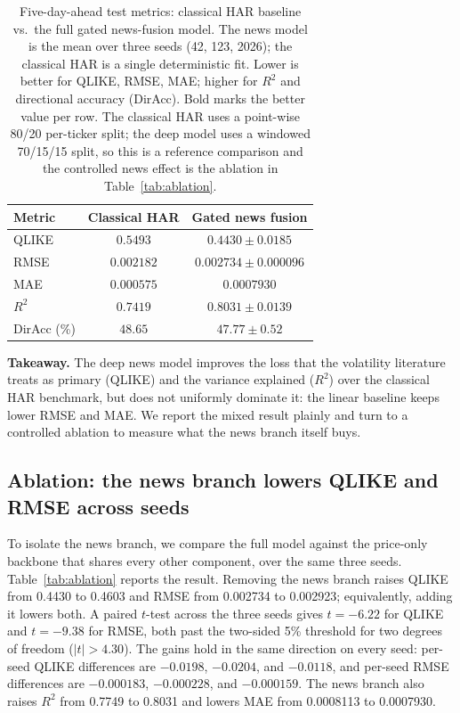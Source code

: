 \documentclass[runningheads]{llncs}
\newcommand{\qlikeBB}{0.4603}
\newcommand{\rmseBB}{0.002923}
\newcommand{\maeBB}{0.0008113}
\newcommand{\rsqBB}{0.7749}
\newcommand{\qlikeNews}{0.4430}
\newcommand{\rmseNews}{0.002734}
\newcommand{\maeNews}{0.0007930}
\newcommand{\rsqNews}{0.8031}
\newcommand{\qliketstat}{-6.22}
\newcommand{\rmsetstat}{-9.38}
\begin{document}
\begin{table}[t]
\caption{Five-day-ahead test metrics: classical HAR baseline vs.\ the full gated news-fusion model.
The news model is the mean over three seeds (42, 123, 2026); the classical HAR is a single
deterministic fit. Lower is better for QLIKE, RMSE, MAE; higher for $R^2$ and directional accuracy
(DirAcc). Bold marks the better value per row. The classical HAR uses a point-wise 80/20 per-ticker
split; the deep model uses a windowed 70/15/15 split, so this is a reference comparison and the
controlled news effect is the ablation in Table~\ref{tab:ablation}.}
\label{tab:headline}
\centering
\begin{tabular}{lcc}
\toprule
Metric & Classical HAR & Gated news fusion \\
\midrule
QLIKE            & $0.5493$              & $\mathbf{0.4430\pm0.0185}$ \\
RMSE             & $\mathbf{0.002182}$   & $0.002734\pm0.000096$ \\
MAE              & $\mathbf{0.000575}$   & $0.0007930$ \\
$R^2$            & $0.7419$              & $\mathbf{0.8031\pm0.0139}$ \\
DirAcc (\%)      & $\mathbf{48.65}$      & $47.77\pm0.52$ \\
\bottomrule
\end{tabular}
\end{table}

\smallskip
\noindent\textbf{Takeaway.} The deep news model improves the loss that the volatility literature
treats as primary (QLIKE) and the variance explained ($R^2$) over the classical HAR benchmark, but
does not uniformly dominate it: the linear baseline keeps lower RMSE and MAE. We report the mixed
result plainly and turn to a controlled ablation to measure what the news branch itself buys.

\subsection{Ablation: the news branch lowers QLIKE and RMSE across seeds}
\label{sec:ablation}
To isolate the news branch, we compare the full model against the price-only backbone that shares
every other component, over the same three seeds. Table~\ref{tab:ablation} reports the result.
Removing the news branch raises QLIKE from \qlikeNews{} to \qlikeBB{} and RMSE from \rmseNews{} to
\rmseBB{}; equivalently, adding it lowers both. A paired $t$-test across the three seeds gives
$t=\qliketstat$ for QLIKE and $t=\rmsetstat$ for RMSE, both past the two-sided 5\% threshold for two
degrees of freedom ($|t|>4.30$). The gains hold in the same direction on every seed: per-seed QLIKE
differences are $-0.0198$, $-0.0204$, and $-0.0118$, and per-seed RMSE differences are $-0.000183$,
$-0.000228$, and $-0.000159$. The news branch also raises $R^2$ from \rsqBB{} to \rsqNews{} and
lowers MAE from \maeBB{} to \maeNews{}.
\end{document}

